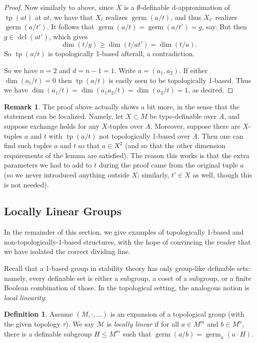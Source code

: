 \documentclass{amsart}
\theoremstyle{definition}
\newtheorem{definition}[theorem]{Definition}
\newtheorem{remark}[theorem]{Remark}
\newcommand{\dcl}{\operatorname{dcl}}
\newcommand{\tp}{\operatorname{tp}}
\begin{document}
\begin{proof}
    Now similarly to above, since $X$ is a $\emptyset$-definable d-approximation of $\tp(at)$ at $at$, we have that $X_t$ realizes $\operatorname{germ}(a/t)$, and thus $X_{t'}$ realizes $\operatorname{germ}(a/t')$. It follows that $\operatorname{germ}(a/t)=\operatorname{germ}(a/t')=g$, say. But then $g\in\dcl(at')$, which gives $$\dim(t/g)\geq\dim(t/at')=\dim(t/a).$$ So $\tp(a/t)$ is topologically 1-based afterall, a contradiction.

    So we have $n=2$ and $d=n-1=1$. Write $a=(a_1,a_2)$. If either $\dim(a_i/t)=0$ then $\tp(a/t)$ is easily seen to be topologically 1-based. Thus we have $\dim(a_1/t)=\dim(a_1a_2/t)=\dim(a_2/t)=1$, as desired.
\end{proof}
\begin{remark}\label{R: reduction to n=2}
    The proof above actually shows a bit more, in the sense that the statement can be localized. Namely, let $X\subset M$ be type-definable over $A$, and suppose exchange holds for any $X$-tuples over $A$. Moreover, suppose there are $X$-tuples $a$ and $t$ with $\tp(a/t)$ not topologically 1-based over $A$. Then one can find such tuples $a$ and $t$ so that $a\in X^2$ (and so that the other dimension requirements of the lemma are satisfied). The reason this works is that the extra parameters we had to add to $t$ during the proof came from the original tuple $a$ (so we never introduced anything outside $X$; similarly, $t'\in X$ as well, though this is not needed).
\end{remark}
\subsection{Locally Linear Groups}\label{ss: local linearity}

In the remainder of this section, we give examples of topologically 1-based and non-topologically-1-based structures, with the hope of convincing the reader that we have isolated the correct dividing line. 

Recall that a 1-based group in stability theory has only group-like definable sets: namely, every definable set is either a subgroup, a coset of a subgroup, or a finite Boolean combination of those. In the topological setting, the analogous notion is \textit{local linearity}:
\begin{definition}
    Assume $(M,\cdot,\dots)$ is an expansion of a topological group (with the given topology $\tau$). We say $\mathcal M$ is \textit{locally linear} if for all $a\in M^m$ and $b\in M^n$, there is a definable subgroup $H\leq M^m$ such that $\operatorname{germ}(a/b)=\operatorname{germ}_a(a\cdot H)$.
\end{definition}
\end{document}
